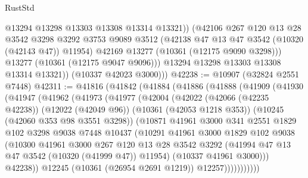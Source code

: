 \begin{lexlean}{RustStd}
\begin{coremodule}
                  @13294
                  @13298
                  @13303
                  @13308
                  @13314
                  @13321))
              (@42106
                @267
                @120
                @13
                @28
                @3542
                @3298
                @3292
                @3753
                @9089
                @3512
                (@42138 @47 @13 @47 @3542 (@10320 (@42143 @47)) @11954)
                @42169
                @13277
                (@10361 (@12175 @9090 @3298)))
              @13277
              (@10361 (@12175 @9047 @9096)))
            @13294
            @13298
            @13303
            @13308
            @13314
            @13321))
        (@10337 @42023 @3000)))
@42238 := @10907 (@32824 @2551 @7448)
@42311 := @41816
    (@41842
      (@41884
        (@41886
          (@41888
            (@41909
              (@41930
                (@41947
                  (@41962
                    (@41973
                      (@41977
                        (@42004
                          (@42022
                            (@42066 (@42235 @42238))
                            (@12022 (@42049 @96))
                            (@10361 (@42053 @1218 @353))
                            (@10245 (@42060 @353 @98 @3551 @3298))
                            (@10871
                              @41961
                              @3000
                              @341
                              @2551
                              @1829
                              @102
                              @3298
                              @9038
                              @7448
                              @10437
                              (@10291
                                @41961
                                @3000
                                @1829
                                @102
                                @9038
                                (@10300
                                  @41961
                                  @3000
                                  @267
                                  @120
                                  @13
                                  @28
                                  @3542
                                  @3292
                                  (@41994 @47 @13 @47 @3542 (@10320 (@41999 @47)) @11954)
                                  (@10337 @41961 @3000)))
                              @42238))
                          @12245
                          (@10361 (@26954 @2691 @1219))
                          @12257)))))))))))

\end{coremodule}
\end{lexlean}
